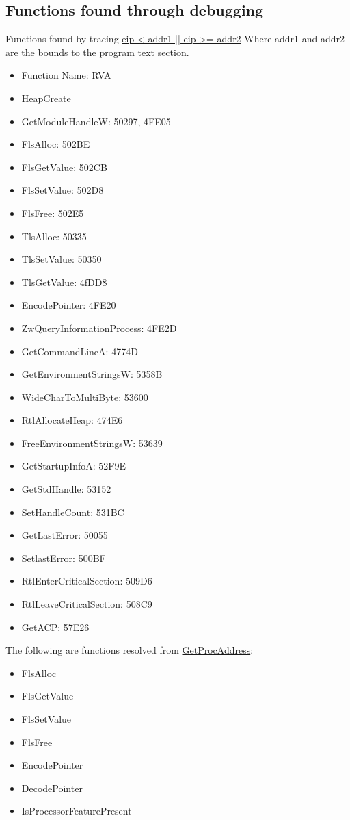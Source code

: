 \documentclass{article}
\begin{document}
    \subsection{Functions found through debugging}
    Functions found by tracing \url{eip < addr1 || eip >= addr2}
    Where addr1 and addr2 are the bounds to the program text section.
    \begin{itemize}
        \item Function Name: RVA
        \item HeapCreate
        \item GetModuleHandleW: 50297, 4FE05
        \item FlsAlloc: 502BE
        \item FlsGetValue: 502CB
        \item FlsSetValue: 502D8
        \item FlsFree: 502E5
        \item TlsAlloc: 50335
        \item TlsSetValue: 50350
        \item TlsGetValue: 4fDD8
        \item EncodePointer: 4FE20
        \item ZwQueryInformationProcess: 4FE2D
        \item GetCommandLineA: 4774D
        \item GetEnvironmentStringsW: 5358B
        \item WideCharToMultiByte: 53600
        \item RtlAllocateHeap: 474E6
        \item FreeEnvironmentStringsW: 53639
        \item GetStartupInfoA: 52F9E
        \item GetStdHandle: 53152
        \item SetHandleCount: 531BC
        \item GetLastError: 50055
        \item SetlastError: 500BF
        \item RtlEnterCriticalSection: 509D6
        \item RtlLeaveCriticalSection: 508C9
        \item GetACP: 57E26
    \end{itemize}
    The following are functions resolved from \url{GetProcAddress}:
    \begin{itemize}
        \item FlsAlloc
        \item FlsGetValue
        \item FlsSetValue
        \item FlsFree
        \item EncodePointer
        \item DecodePointer
        \item IsProcessorFeaturePresent
    \end{itemize}
\end{document}

